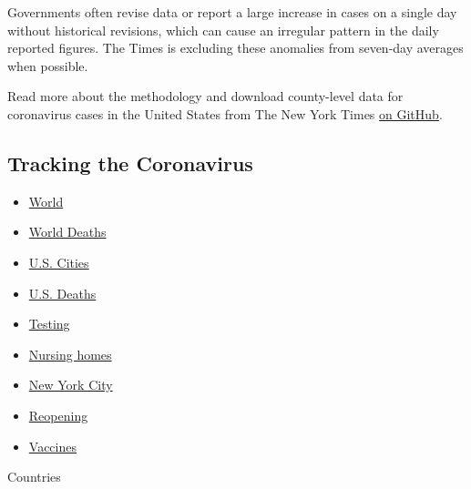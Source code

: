 Governments often revise data or report a large increase in cases on a
single day without historical revisions, which can cause an irregular
pattern in the daily reported figures. The Times is excluding these
anomalies from seven-day averages when possible.

Read more about the methodology and download county-level data for
coronavirus cases in the United States from The New York Times
\href{https://github.com/nytimes/covid-19-data}{on GitHub}.

\hypertarget{tracking-the-coronavirus}{%
\subsection{Tracking the Coronavirus}\label{tracking-the-coronavirus}}

\begin{itemize}
\tightlist
\item
  \href{https://www.nytimes3xbfgragh.onion/interactive/2020/world/coronavirus-maps.html}{World}
\item
  \href{https://www.nytimes3xbfgragh.onion/interactive/2020/04/21/world/coronavirus-missing-deaths.html}{World
  Deaths}
\item
  \href{https://www.nytimes3xbfgragh.onion/interactive/2020/04/23/upshot/five-ways-to-monitor-coronavirus-outbreak-us.html}{U.S.
  Cities}
\item
  \href{https://www.nytimes3xbfgragh.onion/interactive/2020/05/05/us/coronavirus-death-toll-us.html}{U.S.
  Deaths}
\item
  \href{https://www.nytimes3xbfgragh.onion/interactive/2020/us/coronavirus-testing.html}{Testing}
\item
  \href{https://www.nytimes3xbfgragh.onion/interactive/2020/us/coronavirus-nursing-homes.html}{Nursing
  homes}
\item
  \href{https://www.nytimes3xbfgragh.onion/interactive/2020/nyregion/new-york-city-coronavirus-cases.html}{New
  York City}
\item
  \href{https://www.nytimes3xbfgragh.onion/interactive/2020/us/states-reopen-map-coronavirus.html}{Reopening}
\item
  \href{https://www.nytimes3xbfgragh.onion/interactive/2020/science/coronavirus-vaccine-tracker.html}{Vaccines}
\end{itemize}

Countries

